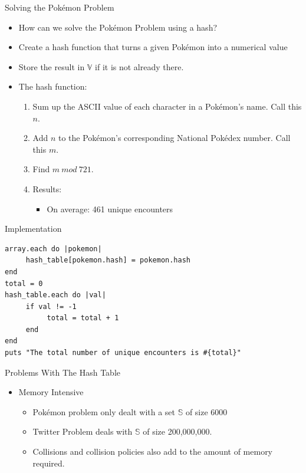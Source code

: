 \documentclass{beamer}
\begin{document}
\begin{frame}{Solving the Pok\'emon Problem}
\begin{itemize}
\item How can we solve the Pok\'emon Problem using a hash?
\pause
\item Create a hash function that turns a given Pok\'emon into a numerical value
\pause
\item Store the result in $\mathbb{V}$ if it is not already there.
\pause
\item The hash function:
\begin{enumerate}
\item Sum up the ASCII value of each character in a Pok\'emon's name. Call this $n$.
\pause
\item Add $n$ to the Pok\'emon's corresponding National Pok\'edex number. Call this $m$.
\pause
\item Find $m\ mod\ 721$.
\pause
\item Results:
\begin{itemize}
\pause
\item On average: 461 unique encounters
\end{itemize}
\end{enumerate}
\end{itemize}
\end{frame}

\begin{frame}[fragile]{Implementation}
\begin{lstlisting}[basicstyle=\small]
array.each do |pokemon|
     hash_table[pokemon.hash] = pokemon.hash
end
total = 0
hash_table.each do |val|
     if val != -1
          total = total + 1
     end
end
puts "The total number of unique encounters is #{total}"
\end{lstlisting}
\end{frame}

\begin{frame}{Problems With The Hash Table}
\begin{itemize}
\item Memory Intensive
\begin{itemize}
\item Pok\'emon problem only dealt with a set $\mathbb{S}$ of size 6000
\pause
\item Twitter Problem deals with $\mathbb{S}$ of size 200,000,000.
\pause
\item Collisions and collision policies also add to the amount of memory required.
\end{itemize}
\end{itemize}
\end{frame}
\end{document}
